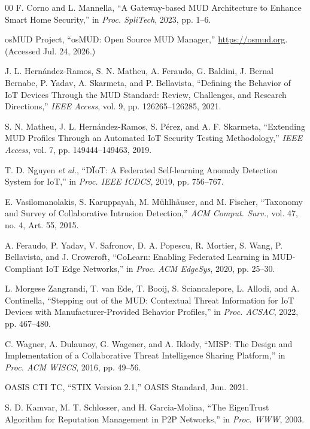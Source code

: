 \documentclass[journal]{IEEEtran}
\theoremstyle{definition}
\begin{document}
\begin{thebibliography}{00}
 F. Corno and L. Mannella, ``A Gateway-based MUD
Architecture to Enhance Smart Home Security,'' in \emph{Proc. SpliTech}, 2023, pp. 1--6.

 osMUD Project, ``osMUD: Open Source MUD Manager,''
\url{https://osmud.org}. (Accessed Jul. 24, 2026.)

 J. L. Hern\'andez-Ramos, S. N. Matheu,
A. Feraudo, G. Baldini, J. Bernal Bernabe, P. Yadav, A. Skarmeta, and
P. Bellavista, ``Defining the Behavior of IoT Devices Through the MUD Standard:
Review, Challenges, and Research Directions,'' \emph{IEEE Access}, vol. 9,
pp. 126265--126285, 2021.

 S. N. Matheu, J. L. Hern\'andez-Ramos, S. P\'erez,
and A. F. Skarmeta, ``Extending MUD Profiles Through an Automated IoT Security
Testing Methodology,'' \emph{IEEE Access}, vol. 7, pp. 149444--149463, 2019.

 T. D. Nguyen \emph{et al.}, ``D\"IoT: A Federated Self-learning Anomaly
Detection System for IoT,'' in \emph{Proc. IEEE ICDCS}, 2019, pp. 756--767.

 E. Vasilomanolakis, S. Karuppayah,
M. M\"uhlh\"auser, and M. Fischer, ``Taxonomy and Survey of Collaborative Intrusion
Detection,'' \emph{ACM Comput. Surv.}, vol. 47, no. 4, Art. 55, 2015.

 A. Feraudo, P. Yadav, V. Safronov, D. A. Popescu, R. Mortier,
S. Wang, P. Bellavista, and J. Crowcroft, ``CoLearn: Enabling Federated Learning
in MUD-Compliant IoT Edge Networks,'' in \emph{Proc. ACM EdgeSys}, 2020,
pp. 25--30.

 L. Morgese Zangrandi, T. van Ede, T. Booij,
S. Sciancalepore, L. Allodi, and A. Continella, ``Stepping out of the MUD:
Contextual Threat Information for IoT Devices with Manufacturer-Provided
Behavior Profiles,'' in \emph{Proc. ACSAC}, 2022, pp. 467--480.

 C. Wagner, A. Dulaunoy, G. Wagener, and A. Iklody, ``MISP: The
Design and Implementation of a Collaborative Threat Intelligence Sharing Platform,'' in
\emph{Proc. ACM WISCS}, 2016, pp. 49--56.

 OASIS CTI TC, ``STIX Version 2.1,'' OASIS Standard, Jun. 2021.

 S. D. Kamvar, M. T. Schlosser, and H. Garcia-Molina, ``The EigenTrust
Algorithm for Reputation Management in P2P Networks,'' in \emph{Proc. WWW}, 2003.


\end{thebibliography}
\end{document}
